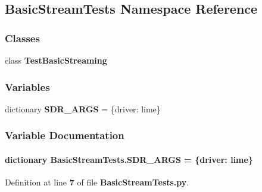 \subsection{Basic\+Stream\+Tests Namespace Reference}
\label{namespaceBasicStreamTests}
\subsubsection*{Classes}
\begin{DoxyCompactItemize}
\item 
class {\bf Test\+Basic\+Streaming}
\end{DoxyCompactItemize}
\subsubsection*{Variables}
\begin{DoxyCompactItemize}
\item 
dictionary {\bf S\+D\+R\+\_\+\+A\+R\+GS} = \{\textquotesingle{}driver\textquotesingle{}\+: \textquotesingle{}lime\textquotesingle{}\}
\end{DoxyCompactItemize}


\subsubsection{Variable Documentation}
\paragraph[{S\+D\+R\+\_\+\+A\+R\+GS}]{\setlength{\rightskip}{0pt plus 5cm}dictionary Basic\+Stream\+Tests.\+S\+D\+R\+\_\+\+A\+R\+GS = \{\textquotesingle{}driver\textquotesingle{}\+: \textquotesingle{}lime\textquotesingle{}\}}\label{namespaceBasicStreamTests_a84f99e74fc0763abc3247b8123dc3d4e}


Definition at line {\bf 7} of file {\bf Basic\+Stream\+Tests.\+py}.

